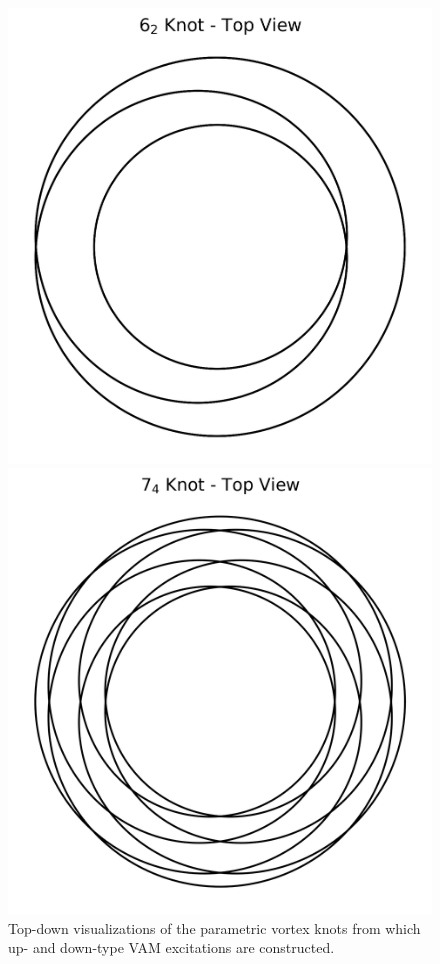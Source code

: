 \documentclass[12pt]{article}
\begin{document}
\begin{figure}[H]
\centering
\begin{minipage}{0.25\textwidth}
    \centering
             \includegraphics[width=\textwidth]{images/knot_6_2_topview.png}
\end{minipage}
\hspace{1em}
\begin{minipage}{0.25\textwidth}
    \centering
            \includegraphics[width=\textwidth]{images/knot_7_4_topview.png}
\end{minipage}
     \caption{Top-down visualizations of the parametric vortex knots from which up- and down-type VAM excitations are constructed.}
\end{figure}
\end{document}
